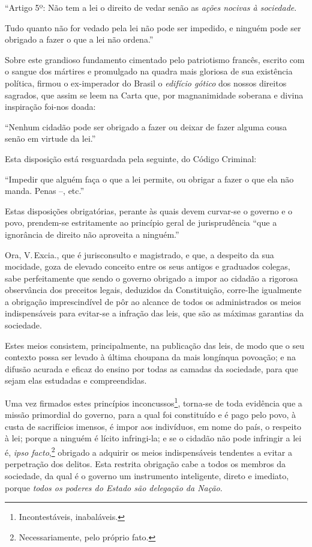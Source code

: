 ``Artigo 5º: Não tem a lei o direito de vedar senão as \emph{ações
nocivas à sociedade}.

Tudo quanto não for vedado pela lei não pode ser impedido, e ninguém
pode ser obrigado a fazer o que a lei não ordena.''

Sobre este grandioso fundamento cimentado pelo patriotismo francês,
escrito com o sangue dos mártires e promulgado na quadra mais gloriosa
de sua existência política, firmou o ex-imperador do Brasil o
\emph{edifício gótico} dos nossos direitos sagrados, que assim se leem
na Carta que, por magnanimidade soberana e divina inspiração foi-nos
doada:

``Nenhum cidadão pode ser obrigado a fazer ou deixar de fazer alguma
cousa senão em virtude da lei.''

Esta disposição está resguardada pela seguinte, do Código Criminal:

``Impedir que alguém faça o que a lei permite, ou obrigar a fazer o que
ela não manda. Penas --, etc.''

Estas disposições obrigatórias, perante às quais devem curvar-se o
governo e o povo, prendem-se estritamente ao princípio geral de
jurisprudência ``que a ignorância de direito não aproveita a ninguém.''

Ora, V.\,Excia., que é jurisconsulto e magistrado, e que, a despeito da
sua mocidade, goza de elevado conceito entre os seus antigos e graduados
colegas, sabe perfeitamente que sendo o governo obrigado a impor ao
cidadão a rigorosa observância dos preceitos legais, deduzidos da
Constituição, corre-lhe igualmente a obrigação imprescindível de pôr ao
alcance de todos os administrados os meios indispensáveis para evitar-se
a infração das leis, que são as máximas garantias da sociedade.

Estes meios consistem, principalmente, na publicação das leis, de modo
que o seu contexto possa ser levado à última choupana da mais longínqua
povoação; e na difusão acurada e eficaz do ensino por todas as camadas
da sociedade, para que sejam elas estudadas e compreendidas.

Uma vez firmados estes princípios inconcussos\footnote{Incontestáveis,
  inabaláveis.}, torna-se de toda evidência que a missão primordial do
governo, para a qual foi constituído e é pago pelo povo, à custa de
sacrifícios imensos, é impor aos indivíduos, em nome do país, o respeito
à lei; porque a ninguém é lícito infringi-la; e se o cidadão não pode
infringir a lei é, \emph{ipso facto},\footnote{Necessariamente, pelo
  próprio fato.} obrigado a adquirir os meios indispensáveis tendentes
a evitar a perpetração dos delitos. Esta restrita obrigação cabe a todos
os membros da sociedade, da qual é o governo um instrumento inteligente,
direto e imediato, porque \emph{todos os poderes do Estado são delegação
da Nação}.

